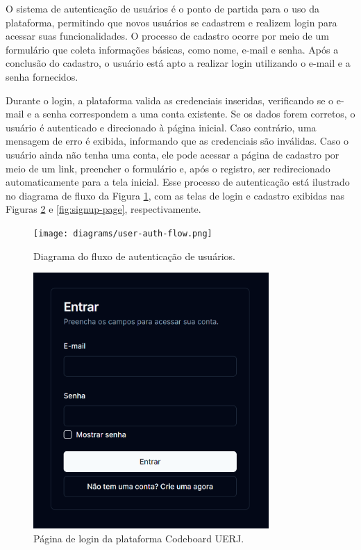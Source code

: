 O sistema de autenticação de usuários é o ponto de partida para o uso da plataforma, permitindo que novos usuários se cadastrem e realizem login para acessar suas funcionalidades. O processo de cadastro ocorre por meio de um formulário que coleta informações básicas, como nome, e-mail e senha. Após a conclusão do cadastro, o usuário está apto a realizar login utilizando o e-mail e a senha fornecidos.

Durante o login, a plataforma valida as credenciais inseridas, verificando se o e-mail e a senha correspondem a uma conta existente. Se os dados forem corretos, o usuário é autenticado e direcionado à página inicial. Caso contrário, uma mensagem de erro é exibida, informando que as credenciais são inválidas. Caso o usuário ainda não tenha uma conta, ele pode acessar a página de cadastro por meio de um link, preencher o formulário e, após o registro, ser redirecionado automaticamente para a tela inicial. Esse processo de autenticação está ilustrado no diagrama de fluxo da Figura \ref{fig:user-auth-flow}, com as telas de login e cadastro exibidas nas Figuras \ref{fig:login-page} e \ref{fig:signup-page}, respectivamente.

\begin{figure}[H]
    \centering
    \caption{Diagrama do fluxo de autenticação de usuários.}
    \label{fig:user-auth-flow}
    \texttt{[image: diagrams/user-auth-flow.png]}
\end{figure}

\begin{figure}[H]
    \centering
    \caption{Página de login da plataforma Codeboard UERJ.}
    \label{fig:login-page}
    \includegraphics[width=0.8\textwidth]{assets/codeboard/login-page.png}
\end{figure}

